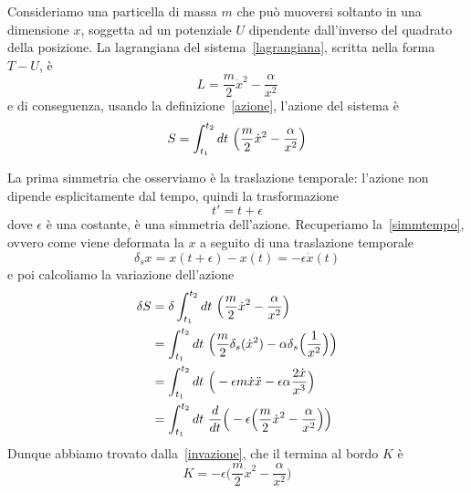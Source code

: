     \begin{example}
        Consideriamo una particella di massa $m$ che può muoversi soltanto in una dimensione $x$, soggetta ad un potenziale $U$ dipendente dall'inverso del quadrato della posizione. La lagrangiana del sistema~\eqref{lagrangiana}, scritta nella forma $T - U$, è
    \begin{equation} \label{lag1}
        L = \frac{m}{2} \dot x^2 - \frac{\alpha}{x^2} 
    \end{equation}
        e di conseguenza, usando la definizione~\eqref{azione}, l'azione del sistema è
    \begin{equation*}
        S = \int_{t_1}^{t_2}dt~ \Big( \frac{m}{2} \dot x^2 - \frac{\alpha}{x^2} \Big)
    \end{equation*}

        La prima simmetria che osserviamo è la traslazione temporale: l'azione non dipende esplicitamente dal tempo, quindi la trasformazione
    \begin{equation*}
        t' = t + \epsilon
    \end{equation*}
        dove $\epsilon$ è una costante, è una simmetria dell'azione. Recuperiamo la~\eqref{simmtempo}, ovvero come viene deformata la $x$ a seguito di una traslazione temporale
    \begin{equation*}
        \delta_s x = x(t + \epsilon) - x(t) = - \epsilon \dot x(t)
    \end{equation*}
        e poi calcoliamo la variazione dell'azione
    \begin{equation*}
    \begin{aligned}
        \delta S & = \delta \int_{t_1}^{t_2}dt~ \Big( \frac{m}{2} \dot x^2 - \frac{\alpha}{x^2} \Big) \\ & = \int_{t_1}^{t_2}dt~ \Big( \frac{m}{2} \delta_s (\dot x^2) - \alpha \delta_s \Big (\frac{1}{x^2} \Big) \Big) \\ & = \int_{t_1}^{t_2}dt~ \Big( - \epsilon m \dot x \ddot x - \epsilon \alpha \frac{2 \dot x}{x^3} \Big) \\ & = \int_{t_1}^{t_2}dt~ \frac{d}{dt} \Big( -\epsilon \Big( \frac{m}{2} \dot x^2 - \frac{\alpha}{x^2} \Big) \Big)
    \end{aligned}
    \end{equation*}
        Dunque abbiamo trovato dalla~\eqref{invazione}, che il termina al bordo $K$ è
    \begin{equation*}
        K = - \epsilon \Big (\frac{m}{2} \dot x^2 - \frac{\alpha}{x^2} \Big)
    \end{equation*}

\end{example}
